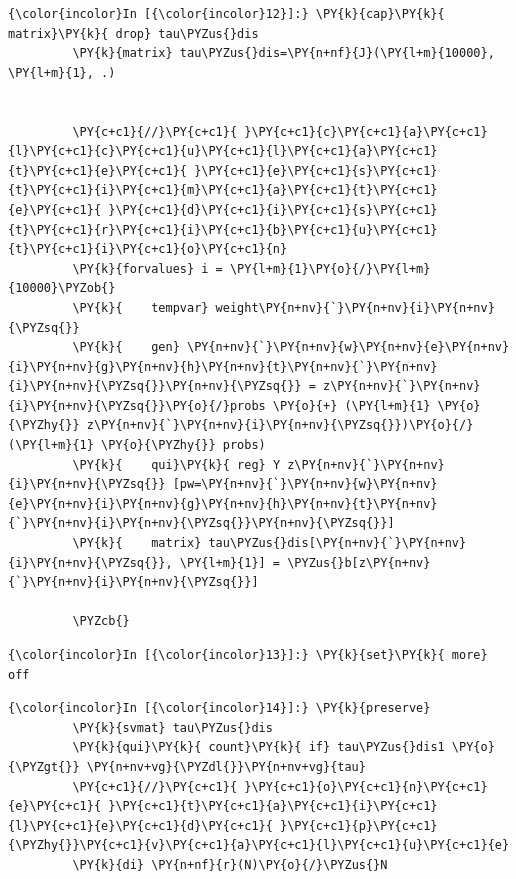 \documentclass[11pt,notitlepage]{article}\usepackage[]{graphicx}\usepackage[]{color}
\makeatletter
\newenvironment{kframe}{%
 \def\at@end@of@kframe{}%
 \ifinner\ifhmode%
  \def\at@end@of@kframe{\end{minipage}}%
  \begin{minipage}{\columnwidth}%
 \fi\fi%
 \def\FrameCommand##1{\hskip\@totalleftmargin \hskip-\fboxsep
 \colorbox{shadecolor}{##1}\hskip-\fboxsep
     \hskip-\linewidth \hskip-\@totalleftmargin \hskip\columnwidth}%
 \MakeFramed {\advance\hsize-\width
   \@totalleftmargin\z@ \linewidth\hsize
   \@setminipage}}%
 {\par\unskip\endMakeFramed%
 \at@end@of@kframe}
\newenvironment{knitrout}{}{} %
\makeatother
\begin{document}
\begin{enumerate}[a)]
\begin{knitrout}
\begin{kframe}
    \begin{Verbatim}[commandchars=\\\{\}]
{\color{incolor}In [{\color{incolor}12}]:} \PY{k}{cap}\PY{k}{ matrix}\PY{k}{ drop} tau\PYZus{}dis
         \PY{k}{matrix} tau\PYZus{}dis=\PY{n+nf}{J}(\PY{l+m}{10000}, \PY{l+m}{1}, .)
         
         
         \PY{c+c1}{//}\PY{c+c1}{ }\PY{c+c1}{c}\PY{c+c1}{a}\PY{c+c1}{l}\PY{c+c1}{c}\PY{c+c1}{u}\PY{c+c1}{l}\PY{c+c1}{a}\PY{c+c1}{t}\PY{c+c1}{e}\PY{c+c1}{ }\PY{c+c1}{e}\PY{c+c1}{s}\PY{c+c1}{t}\PY{c+c1}{i}\PY{c+c1}{m}\PY{c+c1}{a}\PY{c+c1}{t}\PY{c+c1}{e}\PY{c+c1}{ }\PY{c+c1}{d}\PY{c+c1}{i}\PY{c+c1}{s}\PY{c+c1}{t}\PY{c+c1}{r}\PY{c+c1}{i}\PY{c+c1}{b}\PY{c+c1}{u}\PY{c+c1}{t}\PY{c+c1}{i}\PY{c+c1}{o}\PY{c+c1}{n}
         \PY{k}{forvalues} i = \PY{l+m}{1}\PY{o}{/}\PY{l+m}{10000}\PYZob{}
         \PY{k}{	tempvar} weight\PY{n+nv}{`}\PY{n+nv}{i}\PY{n+nv}{\PYZsq{}}
         \PY{k}{	gen} \PY{n+nv}{`}\PY{n+nv}{w}\PY{n+nv}{e}\PY{n+nv}{i}\PY{n+nv}{g}\PY{n+nv}{h}\PY{n+nv}{t}\PY{n+nv}{`}\PY{n+nv}{i}\PY{n+nv}{\PYZsq{}}\PY{n+nv}{\PYZsq{}} = z\PY{n+nv}{`}\PY{n+nv}{i}\PY{n+nv}{\PYZsq{}}\PY{o}{/}probs \PY{o}{+} (\PY{l+m}{1} \PY{o}{\PYZhy{}} z\PY{n+nv}{`}\PY{n+nv}{i}\PY{n+nv}{\PYZsq{}})\PY{o}{/}(\PY{l+m}{1} \PY{o}{\PYZhy{}} probs)
         \PY{k}{	qui}\PY{k}{ reg} Y z\PY{n+nv}{`}\PY{n+nv}{i}\PY{n+nv}{\PYZsq{}} [pw=\PY{n+nv}{`}\PY{n+nv}{w}\PY{n+nv}{e}\PY{n+nv}{i}\PY{n+nv}{g}\PY{n+nv}{h}\PY{n+nv}{t}\PY{n+nv}{`}\PY{n+nv}{i}\PY{n+nv}{\PYZsq{}}\PY{n+nv}{\PYZsq{}}]
         \PY{k}{	matrix} tau\PYZus{}dis[\PY{n+nv}{`}\PY{n+nv}{i}\PY{n+nv}{\PYZsq{}}, \PY{l+m}{1}] = \PYZus{}b[z\PY{n+nv}{`}\PY{n+nv}{i}\PY{n+nv}{\PYZsq{}}]	
         
         \PYZcb{}
\end{Verbatim}

    \begin{Verbatim}[commandchars=\\\{\}]
{\color{incolor}In [{\color{incolor}13}]:} \PY{k}{set}\PY{k}{ more} off
\end{Verbatim}

    \begin{Verbatim}[commandchars=\\\{\}]
{\color{incolor}In [{\color{incolor}14}]:} \PY{k}{preserve}
         \PY{k}{svmat} tau\PYZus{}dis
         \PY{k}{qui}\PY{k}{ count}\PY{k}{ if} tau\PYZus{}dis1 \PY{o}{\PYZgt{}} \PY{n+nv+vg}{\PYZdl{}}\PY{n+nv+vg}{tau}
         \PY{c+c1}{//}\PY{c+c1}{ }\PY{c+c1}{o}\PY{c+c1}{n}\PY{c+c1}{e}\PY{c+c1}{ }\PY{c+c1}{t}\PY{c+c1}{a}\PY{c+c1}{i}\PY{c+c1}{l}\PY{c+c1}{e}\PY{c+c1}{d}\PY{c+c1}{ }\PY{c+c1}{p}\PY{c+c1}{\PYZhy{}}\PY{c+c1}{v}\PY{c+c1}{a}\PY{c+c1}{l}\PY{c+c1}{u}\PY{c+c1}{e}
         \PY{k}{di} \PY{n+nf}{r}(N)\PY{o}{/}\PYZus{}N
         

\end{Verbatim}
\end{kframe}
\end{knitrout}
\end{enumerate}
\end{document}
